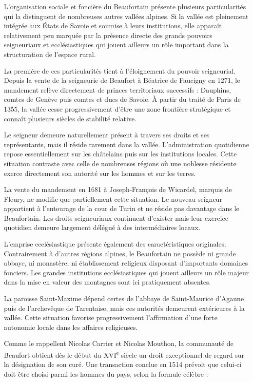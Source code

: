 \documentclass[12pt,a4paper]{report}
\begin{document}
L'organisation sociale et foncière du Beaufortain présente plusieurs particularités qui la distinguent de nombreuses autres vallées alpines. Si la vallée est pleinement intégrée aux États de Savoie et soumise à leurs institutions, elle apparaît relativement peu marquée par la présence directe des grands pouvoirs seigneuriaux et ecclésiastiques qui jouent ailleurs un rôle important dans la structuration de l'espace rural.

La première de ces particularités tient à l'éloignement du pouvoir seigneurial. Depuis la vente de la seigneurie de Beaufort à Béatrice de Faucigny en 1271, le mandement relève directement de princes territoriaux successifs : Dauphins, comtes de Genève puis comtes et ducs de Savoie. À partir du traité de Paris de 1355, la vallée cesse progressivement d'être une zone frontière stratégique et connaît plusieurs siècles de stabilité relative.

Le seigneur demeure naturellement présent à travers ses droits et ses représentants, mais il réside rarement dans la vallée. L'administration quotidienne repose essentiellement sur les châtelains puis sur les institutions locales. Cette situation contraste avec celle de nombreuses régions où une noblesse résidente exerce directement son autorité sur les hommes et sur les terres.

La vente du mandement en 1681 à Joseph-François de Wicardel, marquis de Fleury, ne modifie que partiellement cette situation. Le nouveau seigneur appartient à l'entourage de la cour de Turin et ne réside pas davantage dans le Beaufortain. Les droits seigneuriaux continuent d'exister mais leur exercice quotidien demeure largement délégué à des intermédiaires locaux.

L'emprise ecclésiastique présente également des caractéristiques originales. Contrairement à d'autres régions alpines, le Beaufortain ne possède ni grande abbaye, ni monastère, ni établissement religieux disposant d'importants domaines fonciers. Les grandes institutions ecclésiastiques qui jouent ailleurs un rôle majeur dans la mise en valeur des montagnes sont ici pratiquement absentes.

La paroisse Saint-Maxime dépend certes de l'abbaye de Saint-Maurice d'Agaune puis de l'archevêque de Tarentaise, mais ces autorités demeurent extérieures à la vallée. Cette situation favorise progressivement l'affirmation d'une forte autonomie locale dans les affaires religieuses.

Comme le rappellent Nicolas Carrier et Nicolas Mouthon, la communauté de Beaufort obtient dès le début du XVI\textsuperscript{e} siècle un droit exceptionnel de regard sur la désignation de son curé. Une transaction conclue en 1514 prévoit que celui-ci doit être choisi parmi les hommes du pays, selon la formule célèbre :
\end{document}
